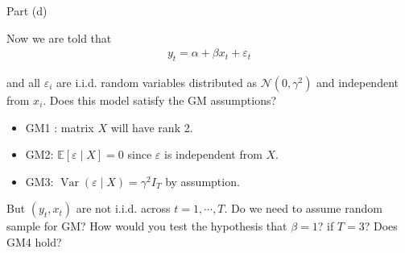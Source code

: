 \begin{frame}{Part (d)}
    
    Now we are told that
    \begin{align*}
        y_t = \alpha + \beta x_t + \varepsilon_t
    \end{align*}

    and all $\varepsilon_i$ are i.i.d. random variables distributed as $\mathcal{N}(0, \gamma^2)$ and independent from $x_i$. Does this model satisfy the GM assumptions?

    \begin{itemize}
        \item GM1 : matrix $X$ will have rank 2.
        \item GM2: $\mathbb{E}[\varepsilon \mid X] = 0$ since $\varepsilon$ is independent from $X$.
        \item GM3: $\operatorname{Var}(\varepsilon \mid X) = \gamma^2 I_T$ by assumption.
    \end{itemize}

    But $(y_t, x_t)$ are not i.i.d. across $t = 1, \cdots, T$. Do we need to assume random sample for GM? How would you test the hypothesis that $\beta = 1$? if $T=3$? Does GM4 hold?
    
\end{frame}
